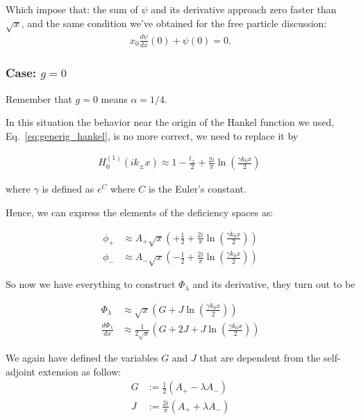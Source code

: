 \noindent
Which impose that: the sum of $\psi$ and its derivative approach zero faster than $\sqrt{x}$, and the same condition we've obtained for the free particle discussion:
\begin{align*}
    x_0 \frac{d\psi}{dx}(0) + \psi(0) = 0.
\end{align*}

\subsubsection{Case: \(g = 0\)}
Remember that $g = 0$ means $\alpha = 1/4$.

In this situation the behavior near the origin of the Hankel function we used, Eq.~\eqref{eq:generig_hankel}, is no more correct, we need to replace it by~\cite{gradshteyn2007}

\begin{align}
    H_0^{(1)}(ik_\pm x) \approx 1 - \frac{l_\pm}{2} + \frac{2i}{\pi} \ln\left(\frac{\gamma k_0 x}{2}\right)\
    \label{eq:hankel_g0}
\end{align}

where $\gamma$ is defined as $e^C$ where $C$ is the Euler's constant.

\noindent
Hence, we can express the elements of the deficiency spaces as:

\begin{align*}
    \phi_+ & \approx A_+ \sqrt{x} \left(+\frac{1}{2}+ \frac{2i}{\pi} \ln \left( \frac{\gamma k_0 x}{2} \right)  \right) \\
    \phi_- & \approx A_- \sqrt{x} \left(-\frac{1}{2}+ \frac{2i}{\pi} \ln \left( \frac{\gamma k_0 x}{2} \right)  \right)
\end{align*}

\noindent
So now we have everything to construct $\Phi_\lambda$ and its derivative, they turn out to be

\begin{align*}
    \Phi_\lambda             & \approx \sqrt{x} \left(G + J \ln\left(\frac{\gamma k_0 x}{2}\right)\right)                 \\
    \frac{d\Phi_\lambda}{dx} & \approx \frac{1}{2\sqrt{x}} \left(G + 2J + J \ln\left(\frac{\gamma k_0 x}{2}\right)\right)
\end{align*}

\noindent
We again have defined the variables $G$ and $J$ that are dependent from the self-adjoint extension as follow:
\begin{align*}
    G & := \frac{1}{2} (A_+ - \lambda A_-)    \\
    J & := \frac{2i}{\pi} (A_+ + \lambda A_-)
\end{align*}

